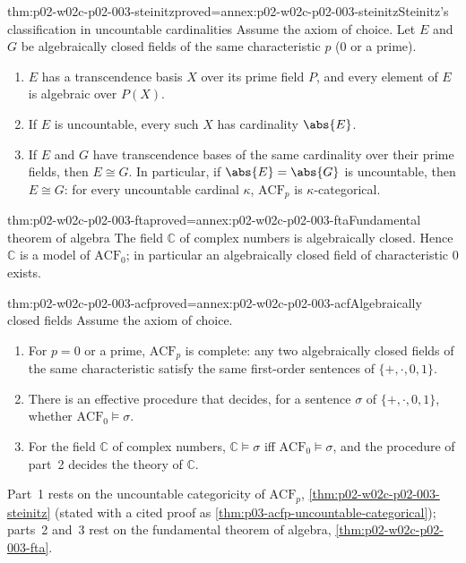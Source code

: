 \begin{hbtheorem}{thm:p02-w02c-p02-003-steinitz}{proved=annex:p02-w02c-p02-003-steinitz}{Steinitz's classification in uncountable cardinalities}
Assume the axiom of choice.  Let \(E\) and \(G\) be algebraically closed
fields of the same characteristic \(p\) (\(0\) or a prime).
\begin{enumerate}
\item \(E\) has a transcendence basis \(X\) over its prime field \(P\), and
      every element of \(E\) is algebraic over \(P(X)\).
\item If \(E\) is uncountable, every such \(X\) has cardinality
      \(\abs{E}\).
\item If \(E\) and \(G\) have transcendence bases of the same cardinality
      over their prime fields, then \(E\cong G\).  In particular, if
      \(\abs{E}=\abs{G}\) is uncountable, then \(E\cong G\): for every
      uncountable cardinal \(\kappa\), \(\mathrm{ACF}_p\) is
      \(\kappa\)-categorical.
\end{enumerate}
\end{hbtheorem}

\begin{hbtheorem}{thm:p02-w02c-p02-003-fta}{proved=annex:p02-w02c-p02-003-fta}{Fundamental theorem of algebra}
The field \(\mathbb C\) of complex numbers is algebraically closed.  Hence
\(\mathbb C\) is a model of \(\mathrm{ACF}_0\); in particular an
algebraically closed field of characteristic \(0\) exists.
\end{hbtheorem}

\begin{hbtheorem}{thm:p02-w02c-p02-003-acf}{proved=annex:p02-w02c-p02-003-acf}{Algebraically closed fields}
Assume the axiom of choice.
\begin{enumerate}
\item For \(p=0\) or a prime, \(\mathrm{ACF}_p\) is complete: any two
      algebraically closed fields of the same characteristic satisfy the
      same first-order sentences of \(\{+,\cdot,0,1\}\).
\item There is an effective procedure that decides, for a sentence
      \(\sigma\) of \(\{+,\cdot,0,1\}\), whether
      \(\mathrm{ACF}_0\models\sigma\).
\item For the field \(\mathbb C\) of complex numbers,
      \(\mathbb C\models\sigma\) iff \(\mathrm{ACF}_0\models\sigma\), and
      the procedure of part~2 decides the theory of \(\mathbb C\).
\end{enumerate}
Part~1 rests on the uncountable categoricity of \(\mathrm{ACF}_p\),
\cref{thm:p02-w02c-p02-003-steinitz} (stated with a cited proof as
\cref{thm:p03-acfp-uncountable-categorical}); parts~2 and~3 rest on the
fundamental theorem of algebra, \cref{thm:p02-w02c-p02-003-fta}.
\end{hbtheorem}

